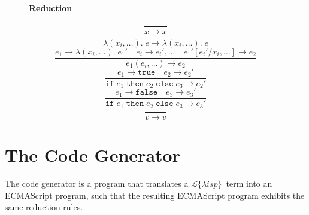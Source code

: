 \documentclass[a4paper]{article}
\newcommand{\lisp}{\ensuremath{\mathcal{L}\{\lambda isp\}}}
\begin{document}
\begin{figure}[h]
\begin{multicols}{2}
\end{multicols}

\hrulefill

{\bf Reduction}

$$\frac{}{x \rightarrow x}$$
$$\frac{}{\lambda(x_i, \dotsc).\;e \rightarrow \lambda(x_i, \dotsc).\;e}$$
$$\frac{e_1 \rightarrow \lambda(x_i, \dotsc).\;e_1' \quad e_i \rightarrow e_i', \dotsc \quad e_1'[e_i' / x_i, \dotsc] \rightarrow e_2}{e_1(e_i, \dotsc) \rightarrow e_2}$$
$$\frac{e_1 \rightarrow \mathtt{true} \quad e_2 \rightarrow e_2'}{\mathtt{if}\;e_1\;\mathtt{then}\;e_2\;\mathtt{else}\;e_3 \rightarrow e_2'}$$
$$\frac{e_1 \rightarrow \mathtt{false} \quad e_3 \rightarrow e_3'}{\mathtt{if}\;e_1\;\mathtt{then}\;e_2\;\mathtt{else}\;e_3 \rightarrow e_3'}$$
$$\frac{}{v \rightarrow v}$$

\end{figure}

\section{The Code Generator}

The code generator is a program that translates a \lisp\ term into an ECMAScript program, such that the resulting ECMAScript program exhibits the same reduction rules.
\end{document}

